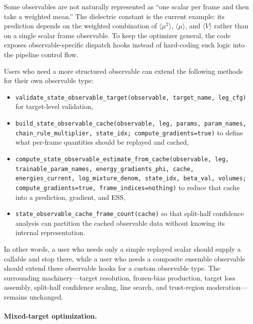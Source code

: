 Some observables are not naturally represented as ``one scalar per frame and
then take a weighted mean.'' The dielectric constant is the current example:
its prediction depends on the weighted combination of
$\langle \mu^2 \rangle$, $\langle \mu \rangle$, and $\langle V \rangle$ rather
than on a single scalar frame observable. To keep the optimizer general, the
code exposes observable-specific dispatch hooks instead of hard-coding such
logic into the pipeline control flow.

Users who need a more structured observable can extend the following methods
for their own observable type:

\begin{itemize}
    \item \texttt{validate\_state\_observable\_target(observable, target\_name, leg\_cfg)} for target-level validation,
    \item \texttt{build\_state\_observable\_cache(observable, leg, params, param\_names, chain\_rule\_multiplier, state\_idx; compute\_gradients=true)} to define what per-frame quantities should be replayed and cached,
    \item \texttt{compute\_state\_observable\_estimate\_from\_cache(observable, leg, \\trainable\_param\_names, energy\_gradients\_phi, cache, energies\_current, log\_mixture\_denom, state\_idx, beta\_val, volumes; \\compute\_gradients=true, frame\_indices=nothing)} to reduce that cache into a prediction, gradient, and ESS,
    \item \texttt{state\_observable\_cache\_frame\_count(cache)} so that split-half confidence analysis can partition the cached observable data without knowing its internal representation.
\end{itemize}

In other words, a user who needs only a simple replayed scalar should supply a
callable and stop there, while a user who needs a composite ensemble observable
should extend these observable hooks for a custom observable type. The
surrounding machinery---target resolution, frozen-bias production, target loss
assembly, split-half confidence scaling, line search, and trust-region
moderation---remains unchanged.

\paragraph{Mixed-target optimization.}

